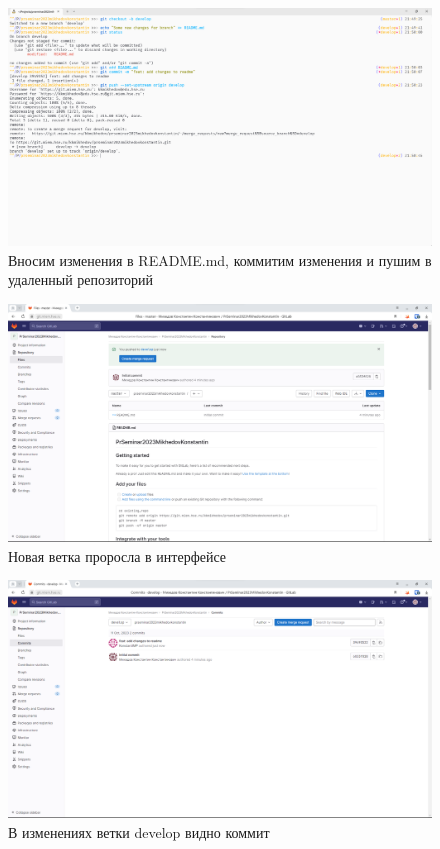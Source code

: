 \documentclass[a4paper]{article}
\begin{document}
  \begin{figure}[H]
    \centering
    \includegraphics[width=\textwidth]{1_ (47)}
    \caption{Вносим изменения в README.md, коммитим изменения и пушим в удаленный репозиторий}
  \end{figure}

  \begin{figure}[H]
    \centering
    \includegraphics[width=\textwidth]{1_ (46)}
    \caption{Новая ветка проросла в интерфейсе}
  \end{figure}

  \begin{figure}[H]
    \centering
    \includegraphics[width=\textwidth]{1_ (45)}
    \caption{В изменениях ветки develop видно коммит}
  \end{figure}
\end{document}
